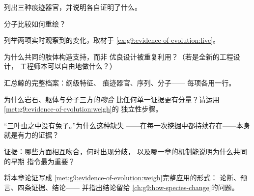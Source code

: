 \begin{exercise}[$\star$]\label{exo:g9:evidence-of-evolution:4}
列出三种痕迹器官，并说明各自证明了什么。
\end{exercise}

\begin{exercise}[$\star$]\label{exo:g9:evidence-of-evolution:5}
分子比较如何重绘？
\end{exercise}

\begin{exercise}[$\star$]\label{exo:g9:evidence-of-evolution:6}
列举两项实时观察到的变化，取材于
\cref{ex:g9:evidence-of-evolution:live}。
\end{exercise}

\begin{exercise}[$\star\star$]\label{exo:g9:evidence-of-evolution:7}
为什么共同的肢体构造支持，而非
优良设计被重复利用？（若是全新的工程设计，
工程师本可以自由地做什么？）
\end{exercise}

\begin{exercise}[$\star\star$]\label{exo:g9:evidence-of-evolution:8}
汇总鲸的完整档案：纲级特征、
痕迹器官、序列、分子——
每项各用一行。
\end{exercise}

\begin{exercise}[$\star\star$]\label{exo:g9:evidence-of-evolution:9}
为什么岩石、躯体与分子三方的\emph{吻合}
比任何单一证据更有分量？请运用
\cref{met:g9:evidence-of-evolution:weigh}的
独立性步骤。
\end{exercise}

\begin{exercise}[$\star\star$]\label{exo:g9:evidence-of-evolution:10}
“三叶虫之中没有兔子。”为什么这种缺失
——在每一次挖掘中都持续存在——本身
就是有力的证据？
\end{exercise}

\begin{exercise}[$\star\star$]\label{exo:g9:evidence-of-evolution:11}
证据：哪些方面相互吻合，何时出现分歧，
以及哪一章的机制能说明为什么共同的早期
指令最为重要？
\end{exercise}

\begin{exercise}[$\star\star\star$]\label{exo:g9:evidence-of-evolution:12}
将本章论证写成
\cref{met:g9:evidence-of-evolution:weigh}完整应用的形式：
论断、预言、四条证据、结论——
并指出结论留给
\cref{ch:g9:how-species-change}的问题。
\end{exercise}

